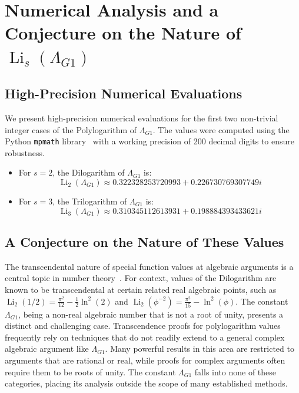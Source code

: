 \documentclass{amsart}
\theoremstyle{plain}
\theoremstyle{definition}
\theoremstyle{remark}
\DeclareMathOperator{\Li}{Li} %
\newcommand{\LambdaG}{\Lambda_{G1}}
\newcommand{\phiG}{\phi}
\begin{document}
\section{Numerical Analysis and a Conjecture on the Nature of \texorpdfstring{$\Li_s(\LambdaG)$}{Li\_s(Lambda\_G1)}}

\subsection{High-Precision Numerical Evaluations}
We present high-precision numerical evaluations for the first two non-trivial integer cases of the Polylogarithm of $\LambdaG$. The values were computed using the Python \texttt{mpmath} library~\cite{mpmath} with a working precision of 200 decimal digits to ensure robustness.
\begin{itemize}
    \item For $s=2$, the Dilogarithm of $\LambdaG$ is:
    \[ \Li_2(\LambdaG) \approx 0.322328253720993 + 0.226730769307749i \]
    
    \item For $s=3$, the Trilogarithm of $\LambdaG$ is:
    \[ \Li_3(\LambdaG) \approx 0.310345112613931 + 0.198884393433621i \]
    
\end{itemize}

\subsection{A Conjecture on the Nature of These Values}
The transcendental nature of special function values at algebraic arguments is a central topic in number theory~\cite{Baker}. For context, values of the Dilogarithm are known to be transcendental at certain related real algebraic points, such as $\Li_2(1/2) = \frac{\pi^2}{12} - \frac{1}{2}\ln^2(2)$ and $\Li_2(\phiG^{-2}) = \frac{\pi^2}{15} - \ln^2(\phiG)$. The constant $\LambdaG$, being a non-real algebraic number that is not a root of unity, presents a distinct and challenging case. Transcendence proofs for polylogarithm values frequently rely on techniques that do not readily extend to a general complex algebraic argument like $\LambdaG$. Many powerful results in this area are restricted to arguments that are rational or real, while proofs for complex arguments often require them to be roots of unity. The constant $\LambdaG$ falls into none of these categories, placing its analysis outside the scope of many established methods.
\end{document}
